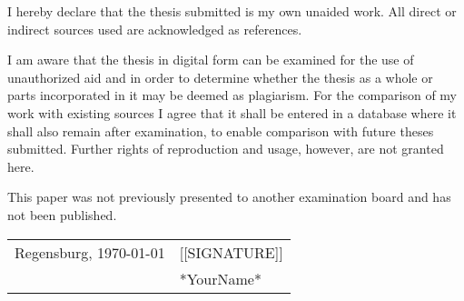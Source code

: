 

\vspace{15.0mm}




I hereby declare that the thesis submitted is my own unaided work.
All direct or indirect sources used are acknowledged as references. 

I am aware that the thesis in digital form can be examined for the
use of unauthorized aid and in order to determine whether the thesis
as a whole or parts incorporated in it may be deemed as plagiarism.
For the comparison of my work with existing sources I agree that it
shall be entered in a database where it shall also remain after examination,
to enable comparison with future theses submitted. Further rights
of reproduction and usage, however, are not granted here. 

This paper was not previously presented to another examination board
and has not been published.

\vspace{2cm}


\noindent \begin{center}
\begin{tabular*}{15cm}{@{\extracolsep{\fill}}cl}
Regensburg, \today & {[}{[}SIGNATURE{]}{]}\tabularnewline
 & *YourName*\tabularnewline
\end{tabular*}
\par\end{center}